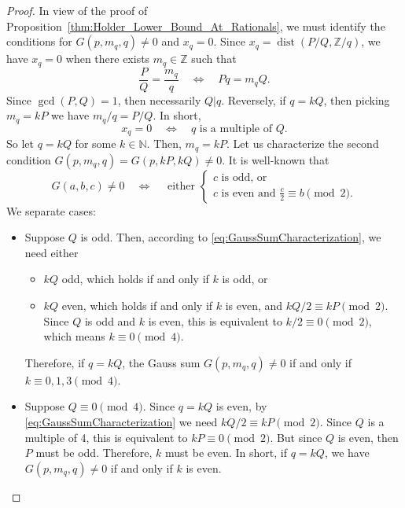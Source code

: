 \documentclass[11pt,reqno]{amsart}
\theoremstyle{definition}
\begin{document}
\begin{proof}
In view of the proof of Proposition~\ref{thm:Holder_Lower_Bound_At_Rationals}, 
we must identify the conditions for $G(p,m_q,q) \neq 0$ and $x_q = 0$. 
Since $x_q = \operatorname{dist}(P/Q, \mathbb Z / q)$, 
we have $x_q = 0$ when there exists $m_q \in \mathbb Z$ such that 
\begin{equation}
\frac{P}{Q} = \frac{m_q}{q} \quad \Longleftrightarrow \quad Pq = m_qQ.
\end{equation}
Since $\operatorname{gcd}(P,Q) = 1$, then necessarily $Q | q$.
Reversely, if $q = kQ$, then picking $m_q = kP$ we have $m_q/q = P/Q$. 
In short, 
\begin{equation}
x_q = 0 \quad  \Longleftrightarrow \quad q \text{ is a multiple of } Q. 
\end{equation}
So let $q = kQ$ for some $k \in \mathbb N$. Then, $m_q = kP$. 
Let us characterize the second condition $G(p,m_q,q) = G(p,kP, kQ) \neq 0$. 
It is well-known that 
\begin{equation}\label{eq:GaussSumCharacterization}
G(a,b,c) \neq 0 \quad \Longleftrightarrow \quad  \text{ either } \left\{ \begin{array}{ll}
c \text{ is odd, or } \\
c \text{ is even and } \frac{c}{2} \equiv b \pmod{2}.
\end{array}
\right.
\end{equation}
 We separate cases:
\begin{itemize}
	\item Suppose $Q$ is odd. Then, according to \eqref{eq:GaussSumCharacterization}, we need either
	\begin{itemize}
		\item $kQ$ odd, which holds if and only if $k$ is odd, or
		\item $kQ$ even, which holds if and only if $k$ is even, and $kQ/2 \equiv kP \pmod{2}$. Since $Q$ is odd and $k$ is even, this is equivalent to $k/2 \equiv 0 \pmod{2}$, which means $k \equiv 0 \pmod{4}$. 
	\end{itemize}
	Therefore, if $q = kQ$, the Gauss sum $G(p,m_q,q) \neq 0$ if and only if $k \equiv 0,1,3 \pmod{4}$. 
	
	\item Suppose $Q \equiv 0 \pmod{4}$. Since $q = kQ$ is even, by \eqref{eq:GaussSumCharacterization} we need $kQ/2 \equiv kP \pmod{2}$. Since $Q$ is a multiple of 4, this is equivalent to $ kP \equiv 0 \pmod{2}$. 
	But since $Q$ is even, then $P$ must be odd. Therefore, $k$ must be even. 
	In short, if $q = kQ$, we have $G(p,m_q,q) \neq 0$ if and only if $k$ is even. 


\end{itemize}
\end{proof}
\end{document}
